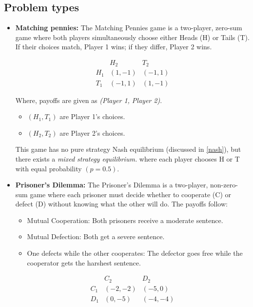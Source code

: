 \documentclass{article}
\begin{document}
\subsection{Problem types}
\begin{itemize}
    \item \textbf{Matching pennies:} The Matching Pennies game is a two-player, zero-sum game where both players simultaneously choose either Heads (H) or Tails (T). If their choices match, Player 1 wins; if they differ, Player 2 wins.

        \[
        \begin{array}{c|cc}
            & H_2 & T_2 \\
            \hline
            H_1 & (1,-1) & (-1,1) \\
            T_1 & (-1,1) & (1,-1)
        \end{array}
        \]
        
        Where, payoffs are given as \textit{(Player 1, Player 2)}.
        \begin{itemize}
            \item $(H_1, T_1)$ are Player 1's choices.
            \item $( H_2, T_2)$ are Player 2's choices.
        \end{itemize}
       
        
        This game has no pure strategy Nash equilibrium (discussed in \ref{nash}), but there exists a \textit{mixed strategy equilibrium.} where each player chooses H or T with equal probability \( (p = 0.5) \).  

    \item \textbf{Prisoner's Dilemma:}
            The Prisoner's Dilemma is a two-player, non-zero-sum game where each prisoner must decide whether to cooperate (C) or defect (D) without knowing what the other will do. The payoffs follow:
            \begin{itemize}
                \item Mutual Cooperation: Both prisoners receive a moderate sentence.
                \item Mutual Defection: Both get a severe sentence.
                \item One defects while the other cooperates: The defector goes free while the cooperator gets the harshest sentence.
            \end{itemize}        
        \[
        \begin{array}{c|cc}
            & C_2 & D_2 \\
            \hline
            C_1 & (-2,-2) & (-5,0) \\
            D_1 & (0,-5) & (-4,-4)
        \end{array}
        \]
        

\end{itemize}
\end{document}
